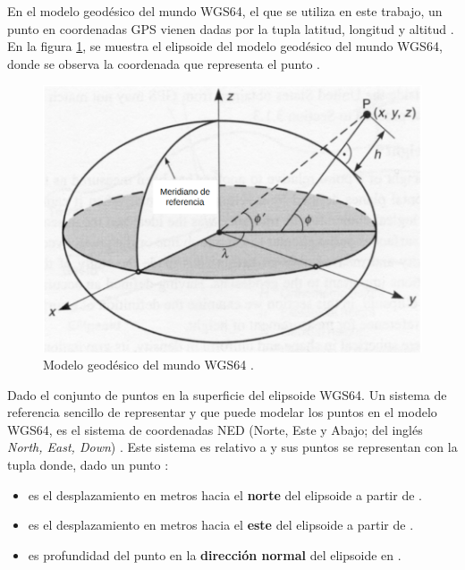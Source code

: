 En el modelo geodésico del mundo WGS64, el que se utiliza en este trabajo, un punto en coordenadas GPS vienen dadas por la tupla latitud, longitud y altitud  \cite{2002convertGPS}. En la figura \ref{fig:WGS64}, se muestra el elipsoide del modelo geodésico del mundo WGS64, donde se observa la coordenada  que representa el punto .

\begin{figure}[H]
    \centering
    \includegraphics[scale=0.3]{partes/img/WGS64.png}
    \caption[Modelo geodésico del mundo WGS64.]{Modelo geodésico del mundo WGS64 \footnotemark.} 
    \label{fig:WGS64}
\end{figure}

Dado  el conjunto de puntos en la superficie del elipsoide WGS64. Un sistema de referencia sencillo de representar y que puede modelar los puntos  en el modelo WGS64, es el sistema de coordenadas NED (Norte, Este y Abajo; del inglés \textit{North, East, Down}) \cite{cai2011coordinate}. Este sistema es relativo a  y sus puntos se representan con la tupla  donde, dado un punto :

\begin{itemize}
    \item {} es el desplazamiento en metros hacia el \textbf{norte} del elipsoide a partir de .
    \item {} es el desplazamiento en metros hacia el \textbf{este} del elipsoide a partir de .
    \item {} es profundidad del punto en la \textbf{dirección normal} del elipsoide en .
\end{itemize}


